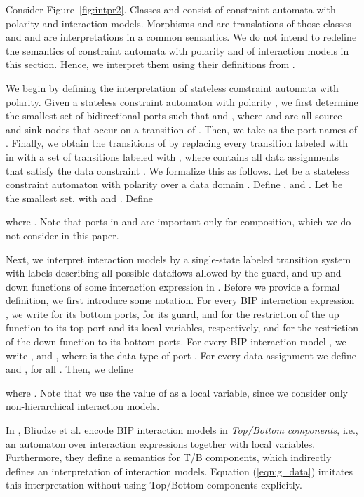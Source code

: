 \documentclass[submission,copyright,creativecommons,hidelinks]{eptcs}
\theoremstyle{plain} \newtheorem{theorem}{Theorem}
\theoremstyle{definition}
\theoremstyle{remark}
\newcommand{\fig}[2][]{Figure~\ref{fig:#2}\ensuremath{#1}}
\begin{document}
Consider \fig{intpr2}. Classes  and  consist of constraint automata with polarity and interaction models. Morphisms  and  are translations of those classes and  and  are interpretations in a common  semantics.
We do not intend to redefine the semantics of constraint automata with polarity and of interaction models in this section. Hence, we interpret them using their definitions from \cite{BSAR06, BBJS14}. 

We begin by defining the interpretation of stateless constraint automata with polarity. 
Given a stateless constraint automaton with polarity , we first determine the smallest set of bidirectional ports  such that  and , where  and  are all source and sink nodes that occur on a transition of . Then, we take  as the port names of . Finally, we obtain the transitions of  by replacing every transition labeled with  in  with a set of transitions labeled with , where  contains all data assignments  that satisfy the data constraint .
We formalize this as follows. Let  be a stateless constraint automaton with polarity over a data domain . 
Define , and .
Let  be the smallest set, with  and . Define 

where .
Note that ports in  and  are important only for composition, which we do not consider in this paper.

Next, we interpret interaction models  by a single-state labeled transition system with labels describing all possible dataflows allowed by the guard, and up and down functions of some interaction expression in .
Before we provide a formal definition, we first introduce some notation. 
For every BIP interaction expression , we write  for its bottom ports,  for its guard,  and  for the restriction of the up function to its top port and its local variables, respectively, and  for the restriction of the down function to its bottom ports.
For every BIP interaction model , we write , and , where  is the data type of port .
For every data assignment  we define  and , for all .
Then, we define

where .
Note that we use the value of  as a local variable, since we consider only non-hierarchical interaction models.

In \cite{BBJS14}, Bliudze et al. encode BIP interaction models in {\em Top/Bottom components}, i.e., an automaton over interaction expressions together with local variables. Furthermore, they define a semantics for T/B components, which indirectly defines an interpretation of interaction models. Equation (\ref{eqn:g_data}) imitates this interpretation without using Top/Bottom components explicitly.
\end{document}
